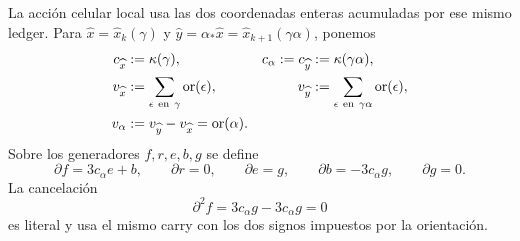 La acción celular local usa las dos coordenadas enteras acumuladas por ese
mismo ledger. Para
\(\widehat x=\widehat x_k(\gamma)\) y
\(\widehat y=\alpha_*\widehat x=\widehat x_{k+1}(\gamma\alpha)\), ponemos
\begin{equation}
\label{rm:eq:pdfv2-cor-c-v}
\begin{aligned}
 c_{\widehat x}&:=\kappa(\gamma),&
 c_\alpha:=c_{\widehat y}&:=\kappa(\gamma\alpha),\\
 v_{\widehat x}&:=\sum_{\epsilon\ {\rm en}\ \gamma}
                  \operatorname{or}(\epsilon),&
 v_{\widehat y}&:=
 \sum_{\epsilon\ {\rm en}\ \gamma\alpha}
                  \operatorname{or}(\epsilon),\\
 v_\alpha&:=v_{\widehat y}-v_{\widehat x}
           =\operatorname{or}(\alpha).
\end{aligned}
\end{equation}
Sobre los generadores \(f,r,e,b,g\) se define
\begin{equation}
\label{rm:eq:pdfv2-cor-complejo-local}
 \partial f=3c_\alpha e+b,\qquad
 \partial r=0,\qquad
 \partial e=g,\qquad
 \partial b=-3c_\alpha g,\qquad
 \partial g=0.
\end{equation}
La cancelación
\begin{equation}
\label{rm:eq:pdfv2-cor-dos-cero}
 \partial^2f=3c_\alpha g-3c_\alpha g=0
\end{equation}
es literal y usa el mismo carry con los dos signos impuestos por la
orientación.

